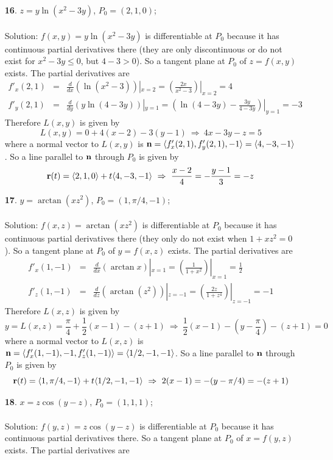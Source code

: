 \documentclass[12pt]{amsbook}
\newcommand{\la}{\langle}
\newcommand{\ra}{\rangle}
\begin{document}
\begin{enumerate}
\item[{\small\bf 16}.] $z=y\ln(x^2-3y)$, $P_0=(2,1,0)$;
\\
\\
{\sc Solution}: $f(x,y)=y\ln(x^2-3y)$ is differentiable at $P_0$ because it has continuous partial derivatives there (they are only discontinuous or do not exist for $x^2-3y\leq 0$, but $4-3>0$). So a tangent plane at $P_0$ of $z=f(x,y)$ exists. The partial derivatives are
\begin{eqnarray*}
f'_x(2,1)&=&\frac{d}{dx}(\ln(x^2-3))|_{x=2}=(\frac{2x}{x^2-3})|_{x=2}=4 \\
f'_y(2,1)&=&\frac{d}{dy}(y\ln(4-3y))|_{y=1}=(\ln(4-3y)-\frac{3y}{4-3y})|_{y=1}=-3
\end{eqnarray*}
Therefore $L(x,y)$ is given by
$$L(x,y)=0+4(x-2)-3(y-1) \ \Rightarrow \ 4x-3y-z=5$$
where a normal vector to $L(x,y)$ is ${\bf n}=\la f'_x(2,1),f'_y(2,1),-1 \ra = \la 4,-3,-1 \ra$.
So a line parallel to ${\bf n}$ through $P_0$ is given by
$${\bf r}(t)=\la 2,1,0 \ra +t \la 4,-3,-1 \ra \ \Rightarrow \ \frac{x-2}{4}=-\frac{y-1}{3}=-z$$
\item[{\small\bf 17}.] $y=\arctan(xz^2)$, $P_0=(1,\pi/4,-1)$;
\\
\\
{\sc Solution}: $f(x,z)=\arctan(xz^2)$ is differentiable at $P_0$ because it has continuous partial derivatives there (they only do not exist when $1+xz^2=0$). So a tangent plane at $P_0$ of $y=f(x,z)$ exists. The partial derivatives are
\begin{eqnarray*}
f'_x(1,-1)&=&\frac{d}{dx}(\arctan x)|_{x=1}=(\frac{1}{1+x^2})|_{x=1}=\frac{1}{2} \\
f'_z(1,-1)&=&\frac{d}{dz}(\arctan(z^2))|_{z=-1}=(\frac{2z}{1+z^4})|_{z=-1}=-1
\end{eqnarray*}
Therefore $L(x,z)$ is given by
$$y=L(x,z)=\frac{\pi}{4}+\frac{1}{2}(x-1)-(z+1) \ \Rightarrow \ \frac{1}{2}(x-1)-(y-\frac{\pi}{4})-(z+1)=0$$
where a normal vector to $L(x,z)$ is ${\bf n}=\la f'_x(1,-1),-1,f'_z(1,-1) \ra = \la 1/2,-1,-1 \ra$.
So a line parallel to ${\bf n}$ through $P_0$ is given by
$${\bf r}(t)=\la 1,\pi/4,-1 \ra +t \la 1/2,-1,-1 \ra \ \Rightarrow \ 2(x-1)=-(y-\pi/4)=-(z+1)$$
\item[{\small\bf 18}.] $x=z\cos(y-z)$, $P_0=(1,1,1)$;
\\
\\
{\sc Solution}: $f(y,z)=z\cos(y-z)$ is differentiable at $P_0$ because it has continuous partial derivatives there. So a tangent plane at $P_0$ of $x=f(y,z)$ exists. The partial derivatives are

\end{enumerate}
\end{document}
